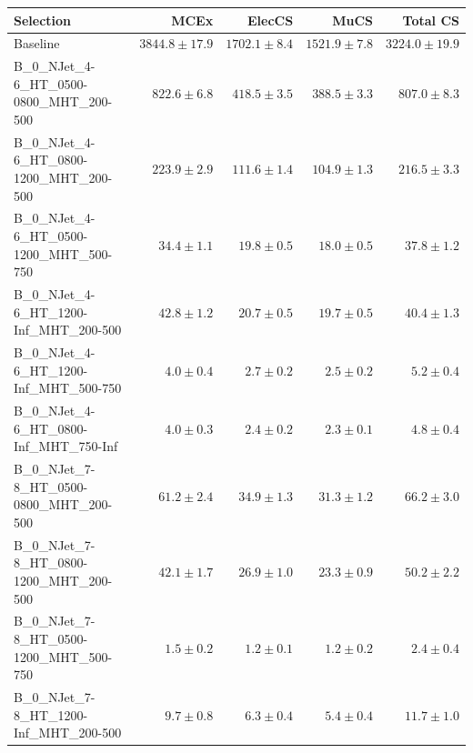 \documentclass{beamer}
\begin{document}
\begin{frame}
\tiny
\begin{tabular}{lrrrr}
\toprule

                                                Selection  &          MCEx  &         ElecCS  &                     MuCS  &          Total CS  \\ 
\midrule
                                         Baseline &           $3844.8\pm17.9$&           $1702.1\pm8.4$&           $1521.9\pm7.8$&               $3224.0\pm19.9$ \\ 
     B\_0\_NJet\_4-6\_HT\_0500-0800\_MHT\_200-500 &             $822.6\pm6.8$&            $418.5\pm3.5$&            $388.5\pm3.3$&                 $807.0\pm8.3$ \\ 
     B\_0\_NJet\_4-6\_HT\_0800-1200\_MHT\_200-500 &             $223.9\pm2.9$&            $111.6\pm1.4$&            $104.9\pm1.3$&                 $216.5\pm3.3$ \\ 
     B\_0\_NJet\_4-6\_HT\_0500-1200\_MHT\_500-750 &              $34.4\pm1.1$&             $19.8\pm0.5$&             $18.0\pm0.5$&                  $37.8\pm1.2$ \\ 
      B\_0\_NJet\_4-6\_HT\_1200-Inf\_MHT\_200-500 &              $42.8\pm1.2$&             $20.7\pm0.5$&             $19.7\pm0.5$&                  $40.4\pm1.3$ \\ 
      B\_0\_NJet\_4-6\_HT\_1200-Inf\_MHT\_500-750 &               $4.0\pm0.4$&              $2.7\pm0.2$&              $2.5\pm0.2$&                   $5.2\pm0.4$ \\ 
      B\_0\_NJet\_4-6\_HT\_0800-Inf\_MHT\_750-Inf &               $4.0\pm0.3$&              $2.4\pm0.2$&              $2.3\pm0.1$&                   $4.8\pm0.4$ \\ 
     B\_0\_NJet\_7-8\_HT\_0500-0800\_MHT\_200-500 &              $61.2\pm2.4$&             $34.9\pm1.3$&             $31.3\pm1.2$&                  $66.2\pm3.0$ \\ 
     B\_0\_NJet\_7-8\_HT\_0800-1200\_MHT\_200-500 &              $42.1\pm1.7$&             $26.9\pm1.0$&             $23.3\pm0.9$&                  $50.2\pm2.2$ \\ 
     B\_0\_NJet\_7-8\_HT\_0500-1200\_MHT\_500-750 &               $1.5\pm0.2$&              $1.2\pm0.1$&              $1.2\pm0.2$&                   $2.4\pm0.4$ \\ 
      B\_0\_NJet\_7-8\_HT\_1200-Inf\_MHT\_200-500 &               $9.7\pm0.8$&              $6.3\pm0.4$&              $5.4\pm0.4$&                  $11.7\pm1.0$ \\ 

\end{tabular}
\end{frame}
\end{document}
